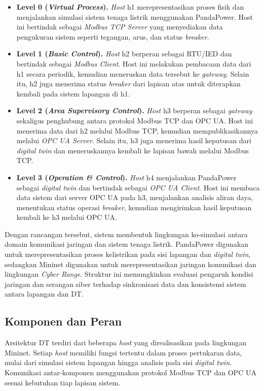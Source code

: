 \begin{itemize}
    \item \textbf{Level 0 (\textit{Virtual Process}).} 
    \textit{Host} h1 merepresentasikan proses fisik dan menjalankan simulasi sistem tenaga listrik menggunakan PandaPower. Host ini bertindak sebagai \textit{Modbus TCP Server} yang menyediakan data pengukuran sistem seperti tegangan, arus, dan status \textit{breaker}.

    \item \textbf{Level 1 (\textit{Basic Control}).} 
    \textit{Host} h2 berperan sebagai RTU/IED dan bertindak sebagai \textit{Modbus Client}. Host ini melakukan pembacaan data dari h1 secara periodik, kemudian meneruskan data tersebut ke \textit{gateway}. Selain itu, h2 juga menerima status \textit{breaker} dari lapisan atas untuk diterapkan kembali pada sistem lapangan di h1.

    \item \textbf{Level 2 (\textit{Area Supervisory Control}).} 
    \textit{Host} h3 berperan sebagai \textit{gateway} sekaligus penghubung antara protokol Modbus TCP dan OPC UA. Host ini menerima data dari h2 melalui Modbus TCP, kemudian mempublikasikannya melalui \textit{OPC UA Server}. Selain itu, h3 juga menerima hasil keputusan dari \textit{digital twin} dan meneruskannya kembali ke lapisan bawah melalui Modbus TCP.

    \item \textbf{Level 3 (\textit{Operation \& Control}).} 
    \textit{Host} h4 menjalankan PandaPower sebagai \textit{digital twin} dan bertindak sebagai \textit{OPC UA Client}. Host ini membaca data sistem dari server OPC UA pada h3, menjalankan analisis aliran daya, menentukan status operasi \textit{breaker}, kemudian mengirimkan hasil keputusan kembali ke h3 melalui OPC UA.
\end{itemize}

Dengan rancangan tersebut, sistem membentuk lingkungan ko-simulasi antara domain komunikasi jaringan dan sistem tenaga listrik. PandaPower digunakan untuk merepresentasikan proses kelistrikan pada sisi lapangan dan \textit{digital twin}, sedangkan Mininet digunakan untuk merepresentasikan jaringan komunikasi dan lingkungan \textit{Cyber Range}. Struktur ini memungkinkan evaluasi pengaruh kondisi jaringan dan serangan siber terhadap sinkronisasi data dan konsistensi sistem antara lapangan dan \ac{DT}.

\subsection{Komponen dan Peran}
\label{subsec:komponen_dan_peran}
Arsitektur \ac{DT} terdiri dari beberapa \textit{host} yang direalisasikan pada lingkungan Mininet. Setiap \textit{host} memiliki fungsi tertentu dalam proses pertukaran data, mulai dari simulasi sistem lapangan hingga analisis pada sisi \textit{digital twin}. Komunikasi antar-komponen menggunakan protokol Modbus TCP dan OPC UA sesuai kebutuhan tiap lapisan sistem.

